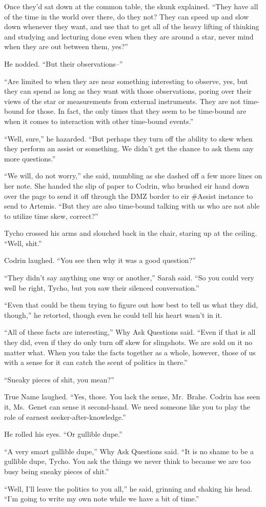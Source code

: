 Once they'd sat down at the common table, the skunk explained. ``They have all of the time in the world over there, do they not? They can speed up and slow down whenever they want, and use that to get all of the heavy lifting of thinking and studying and lecturing done even when they are around a star, never mind when they are out between them, yes?''

He nodded. ``But their observations--''

``Are limited to when they are near something interesting to observe, yes, but they can spend as long as they want with those observations, poring over their views of the star or measurements from external instruments. They are not time-bound for those. In fact, the only times that they seem to be time-bound are when it comes to interaction with other time-bound events.''

``Well, sure,'' he hazarded. ``But perhaps they turn off the ability to skew when they perform an assist or something. We didn't get the chance to ask them any more questions.''

``We will, do not worry,'' she said, mumbling as she dashed off a few more lines on her note. She handed the slip of paper to Codrin, who brushed eir hand down over the page to send it off through the DMZ border to eir \#Assist instance to send to Artemis. ``But they are also time-bound talking with us who are not able to utilize time skew, correct?''

Tycho crossed his arms and slouched back in the chair, staring up at the ceiling. ``Well, shit.''

Codrin laughed. ``You see then why it was a good question?''

``They didn't say anything one way or another,'' Sarah said. ``So you could very well be right, Tycho, but you saw their silenced conversation.''

``Even that could be them trying to figure out how best to tell us what they did, though,'' he retorted, though even he could tell his heart wasn't in it.

``All of these facts are interesting,'' Why Ask Questions said. ``Even if that is all they did, even if they do only turn off skew for slingshots. We are sold on it no matter what. When you take the facts together as a whole, however, those of us with a sense for it can catch the scent of politics in there.''

``Sneaky pieces of shit, you mean?''

True Name laughed. ``Yes, those. You lack the sense, Mr.~Brahe. Codrin has seen it, Ms.~Genet can sense it second-hand. We need someone like you to play the role of earnest seeker-after-knowledge.''

He rolled his eyes. ``Or gullible dupe.''

``A very smart gullible dupe,'' Why Ask Questions said. ``It is no shame to be a gullible dupe, Tycho. You ask the things we never think to because we are too busy being sneaky pieces of shit.''

``Well, I'll leave the politics to you all,'' he said, grinning and shaking his head. ``I'm going to write my own note while we have a bit of time.''
